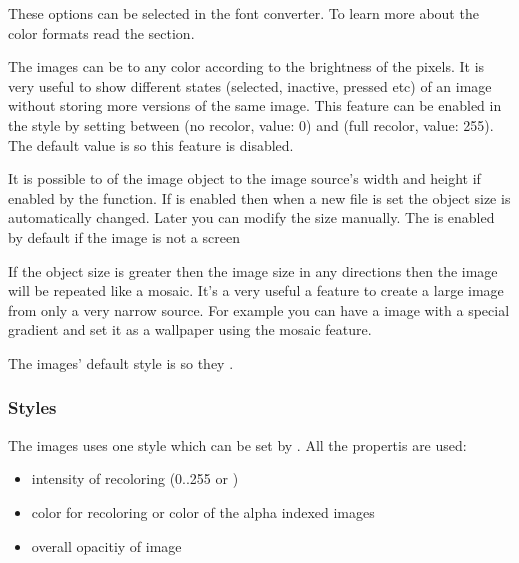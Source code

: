 \documentclass[letterpaper,10pt,english]{sphinxmanual}
\begin{document}
These options can be selected in the font converter. To learn more about the color formats read the {\hyperref[\detokenize{overview/images::doc}]{}} section.

The images can be  to any color according to the brightness of the pixels.
It is very useful to show different states (selected, inactive, pressed etc) of an image without storing more versions of the same image.
This feature can be enabled in the style by setting  between  (no recolor, value: 0) and  (full recolor, value: 255).
The default value is  so this feature is disabled.

It is possible to  of the image object to the image source’s width and height if enabled by the  function.
If  is enabled then when a new file is set the object size is automatically changed. Later you can modify the size manually. The  is enabled by default if the image is not a screen

If the object size is greater then the image size in any directions then the image will be repeated like a mosaic.
It’s a very useful a feature to create a large image from only a very narrow source.
For example you can have a  image with a special gradient and set it as a wallpaper using the mosaic feature.

The images’ default style is  so they .


\subsubsection{Styles}
\label{\detokenize{object-types/img:styles}}
The images uses one style which can be set by . All the  propertis are used:
\begin{itemize}
\item {} 
 intensity of recoloring (0..255 or )

\item {} 
 color for recoloring or color of the alpha indexed images

\item {} 
 overall opacitiy of image

\end{itemize}
\end{document}
